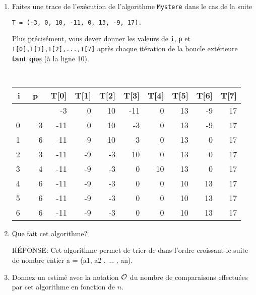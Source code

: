         
\vspace{.25in}
\begin{enumerate}[1)]
\item {}Faites une trace de l'ex\'ecution de l'algorithme {\tt Mystere} dans le cas de
la suite \bigskip

\centerline{{\large \tt T = (-3, 0, 10, -11, 0, 13, -9, 17).}}


\medskip
Plus pr\'ecis\'ement, vous devez donner les valeurs de {\tt i}, {\tt p} et 
{\tt T[0],T[1],T[2],...,T[7]}
apr\`es  chaque it\'eration de la boucle ext\'erieure {\bf tant que} 
(\`a la ligne 10).\\
\smallskip

\begin{framed}


{\large
\begin{center}
{\tt
\begin{tabular}{|r|r|r|r|r|r|r|r|r|r|} \hline
i&~p~&T[0]&T[1]&T[2]&T[3]&T[4]&T[5]&T[6]&T[7]\\  \hline
 & & -3& 0&10 &-11& 0& 13& -9&17\\  \hline
0 & 3& -11& 0& 10& -3& 0& 13& -9&17 \\  \hline
1 & 6& -11& -9& 10&  -3& 0& 13& 0&17 \\  \hline
2 & 3& -11& -9& -3&  10& 0& 13& 0&17 \\  \hline
3 & 4& -11& -9& -3& 0& 10& 13& 0&17  \\  \hline
4 & 6& -11& -9& -3&  0& 0& 10& 13&17 \\  \hline
5 & 6& -11& -9& -3&  0& 0& 10& 13&17 \\  \hline
6& 6& -11& -9& -3&  0& 0& 10& 13&17 \\  \hline
\end{tabular}}
\end{center}
}
\end{framed}
\vspace{.25in}
\item {}
Que fait cet algorithme?
\begin{framed}
R\'EPONSE:
Cet algorithme permet de trier de dans l'ordre croissant le suite de nombre entier a = (a1, a2 , ... , an).

\end{framed}

\vspace{.25in}
\item {}
Donnez un estim\'e avec la notation ${\cal O}$ du nombre de comparaisons effectu\'ees par cet algorithme en fonction de $n$. 



\end{enumerate}
